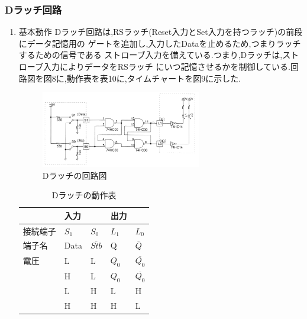 \documentclass[twocolumn, 10pt,a4j]{jsarticle}
\begin{document}
  \subsubsection{Dラッチ回路}
    \begin{enumerate}
      \item 基本動作
      Dラッチ回路は,RSラッチ(Reset入力とSet入力を持つラッチ)の前段にデータ記憶用の
      ゲートを追加し,入力したDataを止めるため,つまりラッチするための信号である
      ストローブ入力を備えている.つまり,Dラッチは,ストローブ入力によりデータをRSラッチ
      にいつ記憶させるかを制御している.回路図を図8に,動作表を表10に,タイムチャートを図9に示した.
      \begin{figure}[H]
        \begin{center}
          \includegraphics[width=7cm]{../img/junjokairo/d_ratch.png}
          \caption{Dラッチの回路図}
        \end{center}
      \end{figure}
      \begin{table}[H]
        \centering
        \caption{Dラッチの動作表}
        \label{my-label}
          \begin{tabular}{l|ll|ll}
              & 入力      &                                 & 出力                           &                                      \\ \hline
          接続端子 & $S_{1}$ & $S_{0}$                         & $L_{1}$ & $L_{0}$                              \\ \hline
          端子名  & Data    & $\overline{Stb}$              & Q       & $\overline{Q}$        \\ \hline
          電圧   & L       & L                               & $Q_{0}$ & $\overline{Q_{0}}$ \\
              & H       & L                               & $Q_{0}$ & $\overline{Q_{0}}$ \\
              & L       & H                               & L       & H                                    \\
              & H       & H                               & H       & L                                   

\end{tabular}
\end{table}
\end{enumerate}
\end{document}
